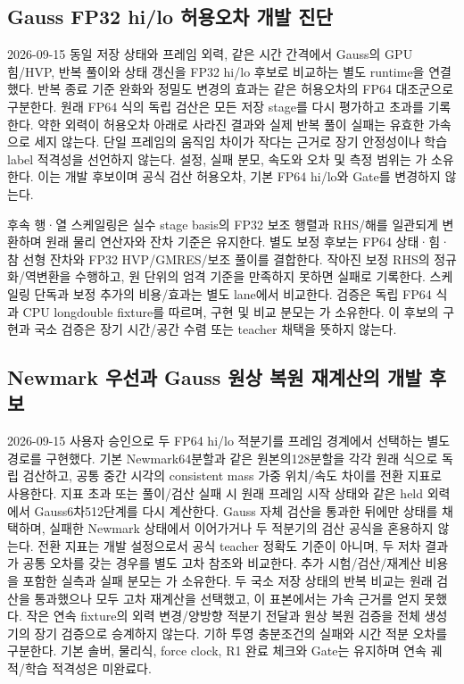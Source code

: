 \documentclass[10pt]{article}
\begin{document}
\subsection{Gauss FP32 hi/lo 허용오차 개발 진단}
2026-09-15 동일 저장 상태와 프레임 외력, 같은 시간 간격에서 Gauss의 GPU 힘/HVP,
반복 풀이와 상태 갱신을 FP32 hi/lo 후보로 비교하는 별도 runtime을 연결했다.
반복 종료 기준 완화와 정밀도 변경의 효과는 같은 허용오차의 FP64 대조군으로 구분한다.
원래 FP64 식의 독립 검산은 모든 저장 stage를 다시 평가하고 초과를 기록한다.
약한 외력이 허용오차 아래로 사라진 결과와 실제 반복 풀이 실패는 유효한 가속으로 세지 않는다.
단일 프레임의 움직임 차이가 작다는 근거로 장기 안정성이나 학습 label 적격성을 선언하지 않는다.
설정, 실패 분모, 속도와 오차 및 측정 범위는
가 소유한다.
이는 개발 후보이며 공식 검산 허용오차, 기본 FP64 hi/lo와 Gate를 변경하지 않는다.

후속 행·열 스케일링은 실수 stage basis의 FP32 보조 행렬과 RHS/해를
일관되게 변환하며 원래 물리 연산자와 잔차 기준은 유지한다.
별도 보정 후보는 FP64 상태·힘·참 선형 잔차와 FP32 HVP/GMRES/보조 풀이를 결합한다.
작아진 보정 RHS의 정규화/역변환을 수행하고, 원 단위의 엄격 기준을 만족하지 못하면 실패로 기록한다.
스케일링 단독과 보정 추가의 비용/효과는 별도 lane에서 비교한다.
검증은 독립 FP64 식과 CPU longdouble fixture를 따르며,
구현 및 비교 분모는 가 소유한다.
이 후보의 구현과 국소 검증은 장기 시간/공간 수렴 또는 teacher 채택을 뜻하지 않는다.

\subsection{Newmark 우선과 Gauss 원상 복원 재계산의 개발 후보}
2026-09-15 사용자 승인으로 두 FP64 hi/lo 적분기를 프레임 경계에서 선택하는 별도 경로를 구현했다.
기본 Newmark64분할과 같은 원본의128분할을 각각 원래 식으로 독립 검산하고,
공통 중간 시각의 consistent mass 가중 위치/속도 차이를 전환 지표로 사용한다.
지표 초과 또는 풀이/검산 실패 시 원래 프레임 시작 상태와 같은 held 외력에서
Gauss6차512단계를 다시 계산한다. Gauss 자체 검산을 통과한 뒤에만 상태를 채택하며,
실패한 Newmark 상태에서 이어가거나 두 적분기의 검산 공식을 혼용하지 않는다.
전환 지표는 개발 설정으로서 공식 teacher 정확도 기준이 아니며, 두 저차 결과가
공통 오차를 갖는 경우를 별도 고차 참조와 비교한다. 추가 시험/검산/재계산 비용을
포함한 실측과 실패 분모는 가 소유한다.
두 국소 저장 상태의 반복 비교는 원래 검산을 통과했으나 모두 고차 재계산을 선택했고,
이 표본에서는 가속 근거를 얻지 못했다. 작은 연속 fixture의 외력 변경/양방향 적분기 전달과
원상 복원 검증을 전체 생성기의 장기 검증으로 승계하지 않는다.
기하 투영 충분조건의 실패와 시간 적분 오차를 구분한다. 기본 솔버, 물리식, force clock,
R1 완료 체크와 Gate는 유지하며 연속 궤적/학습 적격성은 미완료다.
\end{document}
